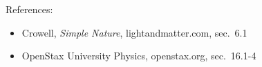 References:
\begin{itemize}
\item Crowell, \emph{Simple Nature}, lightandmatter.com, sec.~6.1
\item OpenStax University Physics, openstax.org, sec.~16.1-4
\end{itemize}

